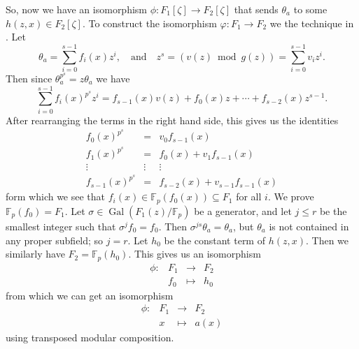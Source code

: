\documentclass[12pt]{article}
\theoremstyle{plain}
\theoremstyle{definition}
\DeclareMathOperator{\gal}{Gal}
\def\F{\mathbb{F}}
\begin{document}
So, now we have an isomorphism $\phi: F_1[\zeta] \rightarrow F_2[\zeta]$ that sends $\theta_a$ to some $h(z, x) \in F_2[\zeta]$. To construct the isomorphism $\varphi: F_1 \rightarrow F_2$ we the technique in \cite{Allombert2002}. Let 
\[ \theta_a = \sum_{i = 0}^{s - 1}f_i(x)z^i, \quad\text{and}\quad z^s = (v(z)  \bmod g(z)) = \sum_{i = 0}^{s - 1}v_iz^i. \] 
Then since $\theta_a^{p^s} = z\theta_a$ we have
\[ \sum_{i = 0}^{s - 1}f_i(x)^{p^s}z^i = f_{s - 1}(x)v(z) + f_0(x)z + \cdots + f_{s - 2}(x)z^{s - 1}.\]
After rearranging the terms in the right hand side, this gives us the identities
\[
\begin{array}{ccc}
f_0(x)^{p^s} & = & v_0f_{s - 1}(x) \\
f_1(x)^{p^s} & = & f_0(x) + v_1f_{s - 1}(x) \\
\vdots & \vdots & \vdots \\
f_{s - 1}(x)^{p^s} & = & f_{s - 2}(x) + v_{s - 1}f_{s - 1}(x)
\end{array} 
\]
form which we see that $f_i(x) \in \F_p(f_0(x)) \subseteq F_1$ for all $i$. We prove $\F_p(f_0) = F_1$. Let $\sigma \in \gal(F_1(z) / \F_p)$ be a generator, and let $j \le r$ be the smallest integer such that $\sigma^jf_0 = f_0$. Then $\sigma^{js}\theta_a = \theta_a$, but $\theta_a$ is not contained in any proper subfield; so $j = r$. Let $h_0$ be the constant term of $h(z, x)$. Then we similarly have $F_2 = \F_p(h_0)$. This gives us an isomorphism
\[
\begin{array}{rlll}
	\phi: & F_1 & \longrightarrow & F_2 \\
	& f_0 & \longmapsto & h_0
\end{array}
\]
from which we can get an isomorphism
\[
\begin{array}{rlll}
	\phi: & F_1 & \longrightarrow & F_2 \\
	& x & \longmapsto & a(x)
\end{array}
\]
using transposed modular composition. 




\end{document}
